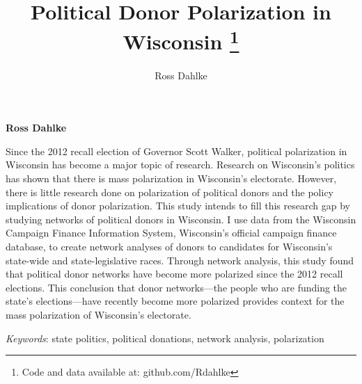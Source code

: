 \documentclass[11pt,]{article}
\title{Political Donor Polarization in Wisconsin \thanks{Code and data available at: github.com/Rdahlke}  }
\author{\Large Ross Dahlke\vspace{0.05in} \newline\normalsize\emph{}  }
\date{}
\newcommand*{\authorfont}{\fontfamily{phv}\selectfont}
\renewenvironment{abstract}
 {{%
    \setlength{\leftmargin}{0mm}
    \setlength{\rightmargin}{\leftmargin}%
  }%
  \relax}
 {\endlist}
\begin{document}
	
%

{%
\setlength{\parindent}{0pt}
\thispagestyle{plain}
{\fontsize{18}{20}\selectfont\raggedright 
\maketitle  %

}

{
   \vskip 13.5pt\relax \normalsize\fontsize{11}{12} 
\textbf{\authorfont Ross Dahlke} \hskip 15pt \emph{\small }   

}

}








\begin{abstract}

    \hbox{\vrule height .2pt width 39.14pc}

    \vskip 8.5pt %

\noindent Since the 2012 recall election of Governor Scott Walker, political
polarization in Wisconsin has become a major topic of research. Research
on Wisconsin's politics has shown that there is mass polarization in
Wisconsin's electorate. However, there is little research done on
polarization of political donors and the policy implications of donor
polarization. This study intends to fill this research gap by studying
networks of political donors in Wisconsin. I use data from the Wisconsin
Campaign Finance Information System, Wisconsin's official campaign
finance database, to create network analyses of donors to candidates for
Wisconsin's state-wide and state-legislative races. Through network
analysis, this study found that political donor networks have become
more polarized since the 2012 recall elections. This conclusion that
donor networks---the people who are funding the state's elections---have
recently become more polarized provides context for the mass
polarization of Wisconsin's electorate.


\vskip 8.5pt \noindent \emph{Keywords}: state politics, political donations, network analysis, polarization \par

    \hbox{\vrule height .2pt width 39.14pc}



\end{abstract}
\end{document}
